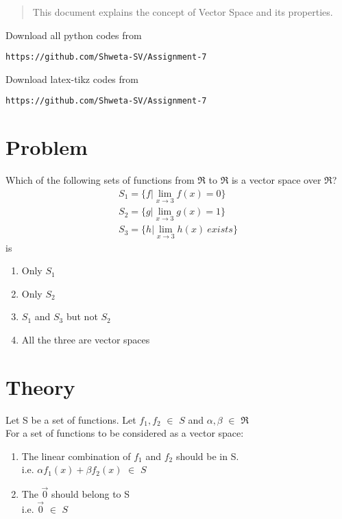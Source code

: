 \documentclass[journal,12pt,twocolumn]{IEEEtran}
\begin{document}
%
\vspace{2ex}
\begin{center}
\end{center}
\begin{abstract}
This document explains the concept of Vector Space and its properties.
\end{abstract}
Download all python codes from 
%
\begin{lstlisting}
https://github.com/Shweta-SV/Assignment-7
\end{lstlisting}
%
Download latex-tikz codes from 
%
\begin{lstlisting}
https://github.com/Shweta-SV/Assignment-7
\end{lstlisting}
%
\section{Problem}
Which of the following sets of functions from $\Re$ to $\Re$ is a vector space over $\Re$?
\begin{align}
S_1 = \{f|\lim_{x\to3} f(x) = 0\}\\
S_2 = \{g|\lim_{x\to3} g(x) = 1\}\\
S_3 = \{h|\lim_{x\to3} h(x)~exists\}
\end{align}
is
\begin{enumerate}
\item Only $S_1$ 
\item Only $S_2$
\item $S_1$ and $S_3$ but not $S_2$ 
\item All the three are vector spaces
\end{enumerate}
\section{Theory}
Let S be a set of functions.
Let $f_1,f_2$ $\in$ $S$ and $\alpha,\beta$ $\in$ $\Re$\\
 For a set of functions to be considered as a vector space:
\begin{enumerate}
\item The linear combination of $f_1$ and $f_2$ should be in S.\\
i.e. $\alpha f_1(x) + \beta f_2(x)$ $\in$ $S$
\item The $\vec{0}$ should belong to S\\
i.e. $\vec{0}$ $\in$ $S$
\end{enumerate}
\end{document}
